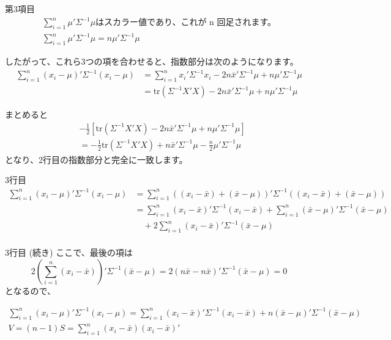 \documentclass[aspectratio=169]{beamer}
\begin{document}
\begin{CJK}{UTF8}{min}
\begin{frame}{第3項目}
\begin{align*}
\sum_{i=1}^n \mu'\Sigma^{-1}\mu\text{はスカラー値であり、これが n 回足されます。}\\
\sum_{i=1}^n \mu'\Sigma^{-1}\mu 
= n\mu'\Sigma^{-1}\mu
\end{align*}

したがって、これら3つの項を合わせると、指数部分は次のようになります。
\begin{align*}
\sum_{i=1}^n (x_i - \mu)'\Sigma^{-1}(x_i - \mu)
&= \sum_{i=1}^n x_i'\Sigma^{-1}x_i - 2n\bar{x}'\Sigma^{-1}\mu + n\mu'\Sigma^{-1}\mu \\
&= \mathrm{tr}(\Sigma^{-1} X'X) - 2n\bar{x}'\Sigma^{-1}\mu + n\mu'\Sigma^{-1}\mu
\end{align*}

\end{frame}

\begin{frame}{まとめると}
    \begin{align*}
    & -\frac{1}{2} \left[ \mathrm{tr}(\Sigma^{-1} X'X) - 2n\bar{x}'\Sigma^{-1}\mu + n\mu'\Sigma^{-1}\mu \right] \\
    &= -\frac{1}{2} \mathrm{tr}(\Sigma^{-1} X'X) + n\bar{x}'\Sigma^{-1}\mu - \frac{n}{2} \mu'\Sigma^{-1}\mu
    \end{align*}
    となり、2行目の指数部分と完全に一致します。
\end{frame}

\begin{frame}{3行目}
\begin{align*}
\sum_{i=1}^n (x_i - \mu)' \Sigma^{-1} (x_i - \mu)
&= \sum_{i=1}^n \left( (x_i - \bar{x}) + (\bar{x} - \mu) \right)' \Sigma^{-1} \left( (x_i - \bar{x}) + (\bar{x} - \mu) \right) \\
&= \sum_{i=1}^n (x_i - \bar{x})' \Sigma^{-1} (x_i - \bar{x}) + \sum_{i=1}^n (\bar{x} - \mu)' \Sigma^{-1} (\bar{x} - \mu) \\
&\quad + 2\sum_{i=1}^n (x_i - \bar{x})' \Sigma^{-1} (\bar{x} - \mu)\\
\end{align*}
\end{frame}

\begin{frame}{3行目 (続き)}
ここで、最後の項は
\[
2\left(\sum_{i=1}^n (x_i - \bar{x})\right)' \Sigma^{-1} (\bar{x} - \mu) = 2(n\bar{x} - n\bar{x})' \Sigma^{-1} (\bar{x} - \mu) = 0
\]
となるので、

\begin{align*}
\sum_{i=1}^n (x_i - \mu)' \Sigma^{-1} (x_i - \mu)
= \sum_{i=1}^n (x_i - \bar{x})' \Sigma^{-1} (x_i - \bar{x}) + n(\bar{x} - \mu)' \Sigma^{-1} (\bar{x} - \mu)\\
V = (n-1)S = \sum_{i=1}^n (x_i - \bar{x})(x_i - \bar{x})'
\end{align*}
\end{frame}


\end{CJK}
\end{document}
